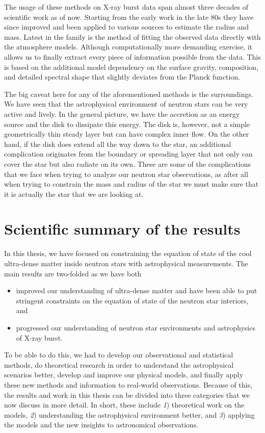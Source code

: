 The usage of these methods on X-ray burst data span almost three decades of scientific work as of now.
Starting from the early work in the late 80s they have since improved and been applied to various sources to estimate the radius and mass.
Latest in the family is the method of fitting the observed data directly with the atmosphere models.\cite{NMS17}
Although computationally more demanding exercise, it allows us to finally extract every piece of information possible from the data.
This is based on the additional model dependency on the surface gravity, composition, and detailed spectral shape that slightly deviates from the Planck function.


The big caveat here for any of the aforementioned methods is the surroundings.
We have seen that the astrophysical environment of neutron stars can be very active and lively.
In the general picture, we have the accretion as an energy source and the disk to dissipate this energy.
The disk is, however, not a simple geometrically thin steady layer but can have complex inner flow.
On the other hand, if the disk does extend all the way down to the star, an additional complication originates from the boundary or spreading layer that not only can cover the star but also radiate on its own.
These are some of the complications that we face when trying to analyze our neutron star observations, as after all when trying to constrain the mass and radius of the star we must make sure that it is actually the star that we are looking at.


\section{Scientific summary of the results}

In this thesis, we have focused on constraining the equation of state of the cool ultra-dense matter inside neutron stars with astrophysical measurements.
The main results are two-folded as we have both
\begin{itemize}
\item improved our understanding of ultra-dense matter and have been able to put stringent constraints on the equation of state of the neutron star interiors, and
\item progressed our understanding of neutron star environments and astrophysics of X-ray burst.
\end{itemize}
To be able to do this, we had to develop our observational and statistical methods, do theoretical research in order to understand the astrophysical scenarios better, develop and improve our physical models, and finally apply these new methods and information to real-world observations.
Because of this, the results and work in this thesis can be divided into three categories that we now discuss in more detail. 
In short, these include \textit{1}) theoretical work on the models, \textit{2}) understanding the astrophysical environment better, and \textit{3}) applying the models and the new insights to astronomical observations.



